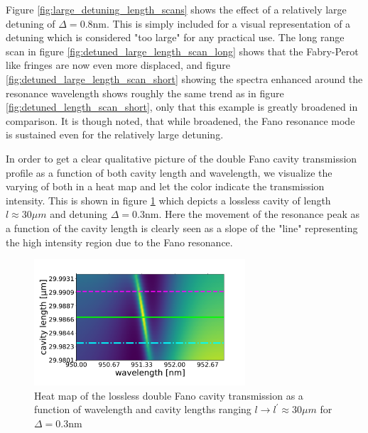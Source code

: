 Figure \ref{fig:large_detuning_length_scans} shows the effect of a relatively large detuning of $\Delta = 0.8$nm. This is simply included for a visual representation of a detuning which is considered "too large" for any practical use. The long range scan in figure \ref{fig:detuned_large_length_scan_long} shows that the Fabry-Perot like fringes are now even more displaced, and figure \ref{fig:detuned_large_length_scan_short} showing the spectra enhanced around the resonance wavelength shows roughly the same trend as in figure \ref{fig:detuned_length_scan_short}, only that this example is greatly broadened in comparison. It is though noted, that while broadened, the Fano resonance mode is sustained even for the relatively large detuning.

In order to get a clear qualitative picture of the double Fano cavity transmission profile as a function of both cavity length and wavelength, we visualize the varying of both in a heat map and let the color indicate the transmission intensity. This is shown in figure \ref{fig:cmap_single} which depicts a lossless cavity of length $l\approx 30 \mu m$ and detuning $\Delta = 0.3$nm. Here the movement of the resonance peak as a function of the cavity length is clearly seen as a slope of the "line" representing the high intensity region due to the Fano resonance. 

\begin{figure}[h!]
    \centering
    \includegraphics[width=0.7\textwidth]{figures/cmap_with_slice_indicators1.pdf}
    \caption{Heat map of the lossless double Fano cavity transmission as a function of wavelength and cavity lengths ranging $l \rightarrow l^{\prime} \approx 30 \mu m$ for $\Delta = 0.3$nm}
    \label{fig:cmap_single}
\end{figure}

